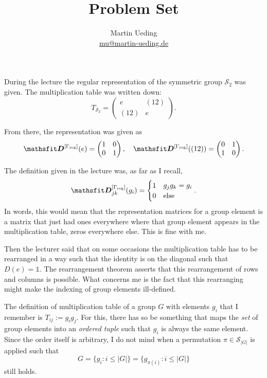 \documentclass[11pt, english, fleqn, DIV=15, headinclude, BCOR=1cm]{scrartcl}
\title{Problem Set \arabic{problemset}}
\author{
    Martin Ueding \\ \small{\href{mailto:mu@martin-ueding.de}{mu@martin-ueding.de}}
}
\begin{document}
\maketitle

\begin{question}
    During the lecture the regular representation of the symmetric group
    $\mathcal S_2$ was given. The multiplication table was written down:
    \[
        T_{\mathcal S_2} =
        \begin{pmatrix}
            e & (12) \\
            (12) & e
        \end{pmatrix}.
    \]

    From there, the representation was given as
    \[
        \tens D^{[\Gamma_\text{reg}]}(e) =
        \begin{pmatrix}
            1 & 0 \\ 0 & 1
        \end{pmatrix}
        \eqnsep
        \tens D^{[\Gamma_\text{reg}]}((12)) =
        \begin{pmatrix}
            0 & 1 \\ 1 & 0
        \end{pmatrix}.
    \]

    The definition given in the lecture was, as far as I recall,
    \[
        \tens D_{jk}^{[\Gamma_\text{reg}]} (g_i) =
        \begin{cases}
            1 & g_j g_k = g_i \\
            0 & \text{else}
        \end{cases}.
    \]
    In words, this would mean that the representation matrices for a group
    element is a matrix that just had ones everywhere where that group element
    appears in the multiplication table, zeros everywhere else. This is fine
    with me.

    Then the lecturer said that on some occasions the multiplication table has
    to be rearranged in a way such that the identity is on the diagonal such
    that $D(e) = \mathbb 1$. The rearrangement theorem asserts that this
    rearrangement of rows and columns is possible. What concerns me is the fact
    that this rearranging might make the indexing of group elements
    ill-defined.

    The definition of multiplication table of a group $G$ with elements $g_i$
    that I remember is $T_{ij} := g_i g_j$. For this, there has so be something
    that maps the \emph{set} of group elements into an \emph{ordered tuple}
    such that $g_i$ is always the same element. Since the order itself is
    arbitrary, I do not mind when a permutation $\pi \in \mathcal S_{|G|}$ is
    applied such that
    \[
        G = \{ g_i\colon i \leq |G| \} = \{ g_{\pi(i)} \colon i \leq |G| \}
    \]
    still holds.


\end{question}
\end{document}
